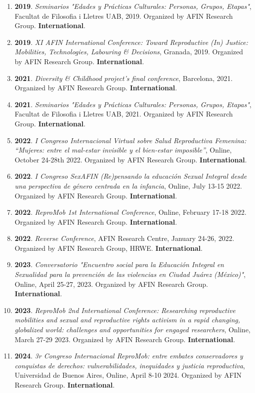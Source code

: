 \begin{enumerate}
\item {\bf 2019}. {\it Seminarios "Edades y Prácticas Culturales: Personas, Grupos, Etapas"}, Facultat de Filosofia i Lletres UAB, 2019. Organized by AFIN Research Group. {\bf International}.\filbreak
\item {\bf 2019}. {\it XI AFIN International Conference:  Toward Reproductive (In) Justice: Mobilities, Technologies, Labouring \& Decisions}, Granada, 2019. Organized by AFIN Research Group. {\bf International}.\filbreak
\item {\bf 2021}. {\it Diversity \& Childhood project’s final conference}, Barcelona, 2021. Organized by AFIN Research Group. {\bf International}.\filbreak
\item {\bf 2021}. {\it Seminarios "Edades y Prácticas Culturales: Personas, Grupos, Etapas"}, Facultat de Filosofia i Lletres UAB, 2021. Organized by AFIN Research Group. {\bf International}.\filbreak
\item {\bf 2022}. {\it I Congreso Internacional Virtual sobre Salud Reproductiva Femenina: “Mujeres: entre el mal-estar invisible y el bien-estar imposible”}, Online, October 24-28th 2022. Organized by AFIN Research Group. {\bf International}.\filbreak
\item {\bf 2022}. {\it I Congreso SexAFIN (Re)pensando la educación Sexual Integral desde una perspectiva de género centrada en la infancia}, Online, July 13-15 2022. Organized by AFIN Research Group. {\bf International}.\filbreak
\item {\bf 2022}. {\it ReproMob 1st International Conference}, Online, February 17-18 2022. Organized by AFIN Research Group. {\bf International}.\filbreak
\item {\bf 2022}. {\it Reverse Conference}, AFIN Research Centre, January 24-26, 2022. Organized by AFIN Research Group, HRWE. {\bf International}.\filbreak
\item {\bf 2023}. {\it Conversatorio "Encuentro social para la Educación Integral en Sexualidad para la prevención de las violencias en Ciudad Juárez (México)"}, Online, April 25-27, 2023. Organized by AFIN Research Group. {\bf International}.\filbreak
\item {\bf 2023}. {\it ReproMob 2nd International Conference: Researching reproductive mobilities and sexual and reproductive rights activism in a rapid changing, globalized world: challenges and opportunities for engaged researchers}, Online, March 27-29 2023. Organized by AFIN Research Group. {\bf International}.\filbreak
\item {\bf 2024}. {\it 3r Congreso Internacional ReproMob: entre embates conservadores y conquistas de derechos: vulnerabilidades, inequidades y justicia reproductiva}, Universidad de Buenos Aires, Online, April 8-10 2024. Organized by AFIN Research Group. {\bf International}.\filbreak
\end{enumerate} 

